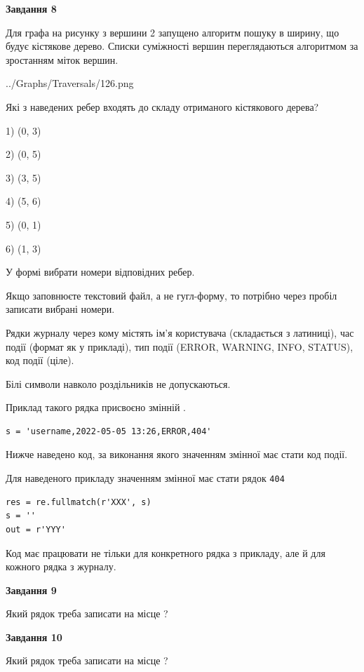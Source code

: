 \documentclass[12pt, ukrainian]{article}
\def\code#1{\Verb!#1!}
\begin{document}
{\begin {large}
{\begin {center}\textbf{Завдання 8}\end {center}}\par
Для графа на рисунку з вершини 2 запущено алгоритм пошуку в ширину, що будує кістякове дерево. Списки суміжності вершин переглядаються алгоритмом за зростанням міток вершин.\par
\begin{center}
	{../Graphs/Traversals/126.png}
\end{center}
\par Які з наведених ребер входять до складу отриманого кістякового дерева?\par
1) (0, 3)\par
2) (0, 5)\par
3) (3, 5)\par
4) (5, 6)\par
5) (0, 1)\par
6) (1, 3)\par
{\vskip 15pt} У формі вибрати номери відповідних ребер.


Якщо заповнюєте текстовий файл, а не гугл-форму, то потрібно через пробіл записа\-ти вибрані номери.\par
\newpage


Рядки журналу через кому містять ім'я користувача (складається з латиниці), час події (фор\-мат як у прикладі), тип події (ERROR, WARNING, INFO, STATUS), код події (ціле).

Білі символи навколо роздільників не допускаються.

Приклад такого рядка присвоєно змінній .



\begin{verbatim}
s = 'username,2022-05-05 13:26,ERROR,404'
\end{verbatim}


Нижче наведено код, за виконання якого значенням змінної  має стати код події.

Для наведеного прикладу значенням змінної  має стати рядок \code{404}



\begin{verbatim}
res = re.fullmatch(r'XXX', s)
s = ''
out = r'YYY'
\end{verbatim}


Код має працювати не тільки для конкретного рядка з прикладу, але й для кожного рядка з журналу.

{\begin {center}\textbf{Завдання 9}\end {center}}\par
Який рядок треба записати на місце  ?\par
\vspace{5mm}


{\begin {center}\textbf{Завдання 10}\end {center}}\par
Який рядок треба записати на місце  ?\par


\newpage


\end {large}}
\end{document}
